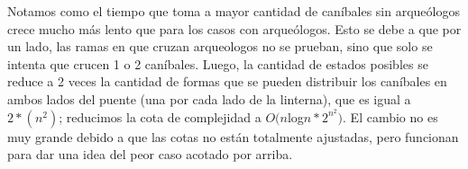   Notamos como el tiempo que toma a mayor cantidad de caníbales sin arqueólogos crece mucho más lento que para los casos con arqueólogos. Esto se debe a que por un lado, las ramas en que cruzan arqueologos no se prueban, sino que solo se intenta que crucen 1 o 2 caníbales. Luego, la cantidad de estados posibles se reduce a 2 veces la cantidad de formas que se pueden distribuir los caníbales en ambos lados del puente (una por cada lado de la linterna), que es igual a $2*(n^2)$; reducimos la cota de complejidad a $O(n $log$ n*2^{n^2})$. El cambio no es muy grande debido a que las cotas no están totalmente ajustadas, pero funcionan para dar una idea del peor caso acotado por arriba.
